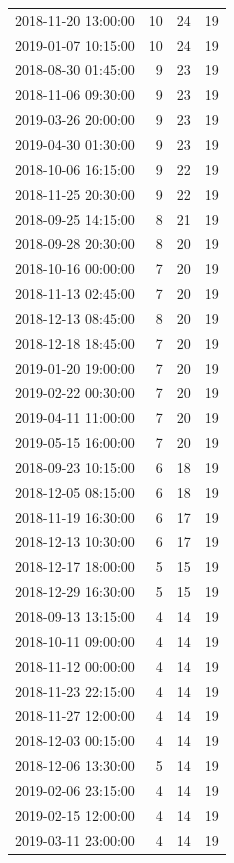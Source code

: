 \begin{tabular}{lrrr}
2018-11-20 13:00:00 & 10 & 24 & 19 \\
2019-01-07 10:15:00 & 10 & 24 & 19 \\
2018-08-30 01:45:00 & 9 & 23 & 19 \\
2018-11-06 09:30:00 & 9 & 23 & 19 \\
2019-03-26 20:00:00 & 9 & 23 & 19 \\
2019-04-30 01:30:00 & 9 & 23 & 19 \\
2018-10-06 16:15:00 & 9 & 22 & 19 \\
2018-11-25 20:30:00 & 9 & 22 & 19 \\
2018-09-25 14:15:00 & 8 & 21 & 19 \\
2018-09-28 20:30:00 & 8 & 20 & 19 \\
2018-10-16 00:00:00 & 7 & 20 & 19 \\
2018-11-13 02:45:00 & 7 & 20 & 19 \\
2018-12-13 08:45:00 & 8 & 20 & 19 \\
2018-12-18 18:45:00 & 7 & 20 & 19 \\
2019-01-20 19:00:00 & 7 & 20 & 19 \\
2019-02-22 00:30:00 & 7 & 20 & 19 \\
2019-04-11 11:00:00 & 7 & 20 & 19 \\
2019-05-15 16:00:00 & 7 & 20 & 19 \\
2018-09-23 10:15:00 & 6 & 18 & 19 \\
2018-12-05 08:15:00 & 6 & 18 & 19 \\
2018-11-19 16:30:00 & 6 & 17 & 19 \\
2018-12-13 10:30:00 & 6 & 17 & 19 \\
2018-12-17 18:00:00 & 5 & 15 & 19 \\
2018-12-29 16:30:00 & 5 & 15 & 19 \\
2018-09-13 13:15:00 & 4 & 14 & 19 \\
2018-10-11 09:00:00 & 4 & 14 & 19 \\
2018-11-12 00:00:00 & 4 & 14 & 19 \\
2018-11-23 22:15:00 & 4 & 14 & 19 \\
2018-11-27 12:00:00 & 4 & 14 & 19 \\
2018-12-03 00:15:00 & 4 & 14 & 19 \\
2018-12-06 13:30:00 & 5 & 14 & 19 \\
2019-02-06 23:15:00 & 4 & 14 & 19 \\
2019-02-15 12:00:00 & 4 & 14 & 19 \\
2019-03-11 23:00:00 & 4 & 14 & 19 \\

\end{tabular}
